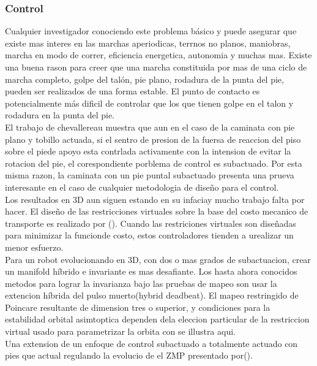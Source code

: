 \documentclass[10pt,onecolumn,twoside,letterpaper]{article}
\begin{document}
\subsubsection{Control}
Cualquier investigador conociendo este problema b\'asico y puede asegurar que existe mas interes en las marchas aperiodicas, terrnos no planos, maniobras, marcha en modo de correr, eficiencia energetica, autonomia y muchas mas. Existe una buena rason para creer que una marcha constituida por mas de una ciclo de marcha completo, golpe del tal\'on, pie plano, rodadura de la punta del pie, pueden ser realizados de una forma estable. El punto de contacto es potencialmente m\'as dificil de controlar que los que tienen golpe en el talon y rodadura en la punta del pie.\cite{Grizzle2014}\\
El trabajo de chevallereau  muestra que aun en el caso de la caminata con pie plano y tobillo actuada, si el sentro de presion de la fuersa de reaccion del piso sobre el piede apoyo esta contrlada activamente con la intension de evitar la rotacion del pie, el corespondiente porblema de control es subactuado. Por esta misma razon, la caminata con un pie puntal subactuado presenta una prueva interesante en el caso de cualquier metodologia de dise\~no para el control.\cite{Grizzle2014}\\
Los resultados en 3D aun siguen estando en su infaciay mucho trabajo falta por hacer. El dise\~no de las restricciones virtuales sobre la base del costo mecanico de transporte es realizado por (). Cuando las restriciones virtuales son dise\~nadas para minimizar la funcionde costo, estos controladores tienden a urealizar un menor esfuerzo.\cite{Grizzle2014}\\
Para un robot evolucionando en 3D, con dos o mas grados de subactuacion, crear un manifold h\'ibrido e invariante es mas desafiante. Los hasta ahora conocidos metodos para lograr la invarianza bajo las pruebas de mapeo son usar la extencion h\'ibrida del pulso muerto(hybrid deadbeat). El mapeo restringido de Poincare resultante de dimension tres o superior, y condiciones para la estabilidad orbital asimtoptica dependen dela eleccion particular de la restriccion virtual usado para parametrizar la orbita con se illustra aqui.\cite{Grizzle2014}\\
Una extension de un enfoque de control subactuado a totalmente actuado  con pies que actual regulando la evolucio de el ZMP presentado por().\cite{Grizzle2014}
\end{document}
